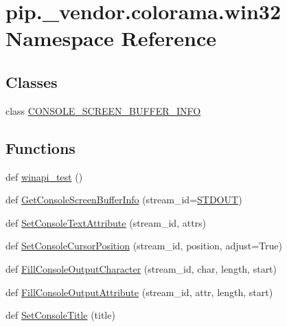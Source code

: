 \hypertarget{namespacepip_1_1__vendor_1_1colorama_1_1win32}{}\section{pip.\+\_\+vendor.\+colorama.\+win32 Namespace Reference}
\label{namespacepip_1_1__vendor_1_1colorama_1_1win32}
\subsection*{Classes}
\begin{DoxyCompactItemize}
\item 
class \hyperlink{classpip_1_1__vendor_1_1colorama_1_1win32_1_1CONSOLE__SCREEN__BUFFER__INFO}{C\+O\+N\+S\+O\+L\+E\+\_\+\+S\+C\+R\+E\+E\+N\+\_\+\+B\+U\+F\+F\+E\+R\+\_\+\+I\+N\+FO}
\end{DoxyCompactItemize}
\subsection*{Functions}
\begin{DoxyCompactItemize}
\item 
def \hyperlink{namespacepip_1_1__vendor_1_1colorama_1_1win32_a6497582409fd73ddecc4fce5dbdbbfb6}{winapi\+\_\+test} ()
\item 
def \hyperlink{namespacepip_1_1__vendor_1_1colorama_1_1win32_af1772bab7a04129ce588abcfc63db4fd}{Get\+Console\+Screen\+Buffer\+Info} (stream\+\_\+id=\hyperlink{namespacepip_1_1__vendor_1_1colorama_1_1win32_a89b0e87f6e3fbb1266ef638ba6a67747}{S\+T\+D\+O\+UT})
\item 
def \hyperlink{namespacepip_1_1__vendor_1_1colorama_1_1win32_a24a5828e9d832b314b4ea411a1c71897}{Set\+Console\+Text\+Attribute} (stream\+\_\+id, attrs)
\item 
def \hyperlink{namespacepip_1_1__vendor_1_1colorama_1_1win32_a4864707416b7461fd98af96750e9c0c4}{Set\+Console\+Cursor\+Position} (stream\+\_\+id, position, adjust=True)
\item 
def \hyperlink{namespacepip_1_1__vendor_1_1colorama_1_1win32_a3081852364f4c549911bd8e198f3173c}{Fill\+Console\+Output\+Character} (stream\+\_\+id, char, length, start)
\item 
def \hyperlink{namespacepip_1_1__vendor_1_1colorama_1_1win32_a4b50b314551c78876b1c13ad217ff870}{Fill\+Console\+Output\+Attribute} (stream\+\_\+id, attr, length, start)
\item 
def \hyperlink{namespacepip_1_1__vendor_1_1colorama_1_1win32_a0a6a755d59fade096e884966fed77803}{Set\+Console\+Title} (title)
\end{DoxyCompactItemize}
